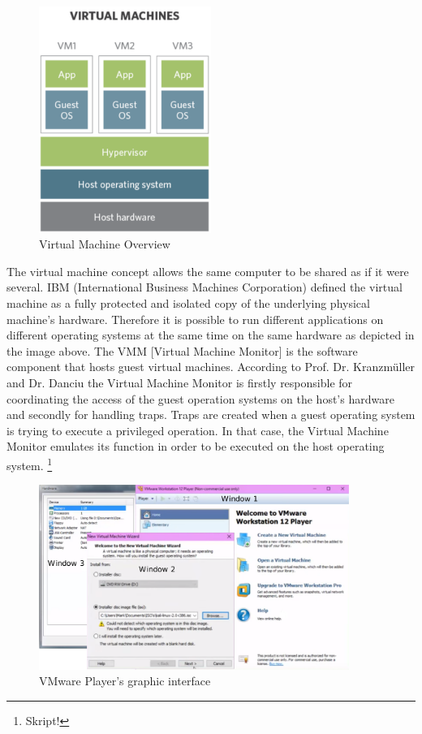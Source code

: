 \documentclass[utf8,biblatex, ngerman, english]{lni}
\begin{document}
\begin{figure}
  \centering
  \includegraphics[width=0.5\textwidth]{VM.pdf}
  \caption{Virtual Machine Overview}
  \label{img:vm}
\end{figure}


\glqq The virtual machine concept allows the same computer to be shared as if it were several. IBM (International Business Machines Corporation) defined the virtual machine as a fully protected and isolated copy of the underlying physical machine’s hardware. \cite{Ss01} 
Therefore it is possible to run different applications on different operating systems at the same time on the same hardware as depicted in the image above. \glqq The VMM [Virtual Machine Monitor] is the software component that hosts guest virtual machines.\glqq \cite{Ss01} According to Prof. Dr. Kranzmüller and Dr. Danciu the Virtual Machine Monitor is firstly responsible for coordinating the access of the guest operation systems on the host's hardware and secondly for handling traps. Traps are created when a guest operating system is trying to execute a privileged operation. In that case, the Virtual Machine Monitor emulates its function in order to be executed on the host operating system. \footnote{Skript!}

\begin{figure}
  \centering
  \includegraphics[width=0.9\textwidth]{VMware Player.pdf}
  \caption{VMware Player's graphic interface}
  \label{img:VMwarePlayer}
\end{figure}
\end{document}
